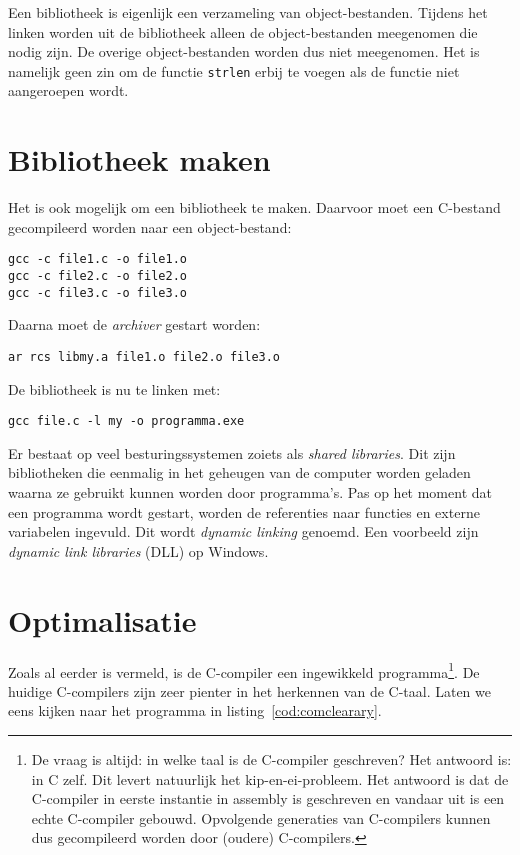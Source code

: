 Een bibliotheek is eigenlijk een verzameling van object-bestanden. Tijdens het linken worden uit de bibliotheek alleen de object-bestanden meegenomen die nodig zijn. De overige object-bestanden worden dus niet meegenomen. Het is namelijk geen zin om de functie \texttt{strlen} erbij te voegen als de functie niet aangeroepen wordt.


\section{Bibliotheek maken}
Het is ook mogelijk om een bibliotheek te maken. Daarvoor moet een C-bestand gecompileerd worden naar een object-bestand:

\hspace*{1em}\texttt{gcc -c file1.c -o file1.o}\\
\hspace*{1em}\texttt{gcc -c file2.c -o file2.o}\\
\hspace*{1em}\texttt{gcc -c file3.c -o file3.o}

Daarna moet de \textsl{archiver} gestart worden:

\hspace*{1em}\texttt{ar rcs libmy.a file1.o file2.o file3.o}

De bibliotheek is nu te linken met:

\hspace*{1em}\texttt{gcc file.c -l my -o programma.exe}

Er bestaat op veel besturingssystemen zoiets als \textsl{shared libraries}. Dit zijn bibliotheken die eenmalig in het geheugen van de computer worden geladen waarna ze gebruikt kunnen worden door programma's. Pas op het moment dat een programma wordt gestart, worden de referenties naar functies en externe variabelen ingevuld. Dit wordt \textsl{dynamic linking} genoemd. Een voorbeeld zijn \textsl{dynamic link libraries} (DLL) op Windows.


\section{Optimalisatie}
Zoals al eerder is vermeld, is de C-compiler een ingewikkeld programma\footnote{De vraag is altijd: in welke taal is de C-compiler geschreven? Het antwoord is: in C zelf. Dit levert natuurlijk het kip-en-ei-probleem. Het antwoord is dat de C-compiler in eerste instantie in assembly is geschreven en vandaar uit is een echte C-compiler gebouwd. Opvolgende generaties van C-compilers kunnen dus gecompileerd worden door (oudere) C-compilers.}. De huidige C-compilers zijn zeer pienter in het herkennen van de C-taal. Laten we eens kijken naar het programma in listing~\ref{cod:comclearary}.

